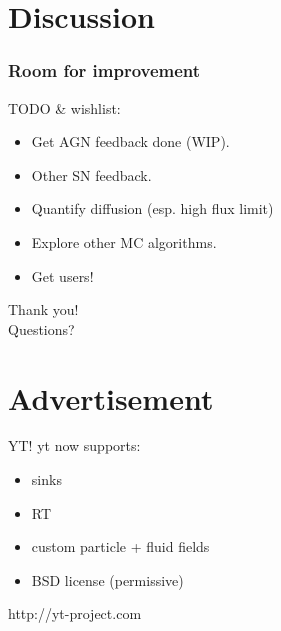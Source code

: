 \documentclass{beamer}
\begin{document}
\section{Discussion}
\begin{frame}
  \frametitle{Room for improvement}
  \begin{block}{TODO \& wishlist:}
    \begin{itemize}
    \item Get AGN feedback done (WIP).
    \item Other SN feedback.
    \item Quantify diffusion (esp. high flux limit)
    \item Explore other MC algorithms.
    \item \pause{} Get users!
    \end{itemize}
  \end{block}
\end{frame}





\begin{frame}[standout]
  Thank you!\\
  Questions?
\end{frame}


\section*{Advertisement}
\begin{frame}{YT!}
  yt now supports:
  \begin{itemize}
  \item sinks
  \item RT
  \item custom particle + fluid fields
  \item \alert{BSD} license (permissive)
  \end{itemize}

  \begin{center}
    \alert{http://yt-project.com}
  \end{center}

\end{frame}
\end{document}
